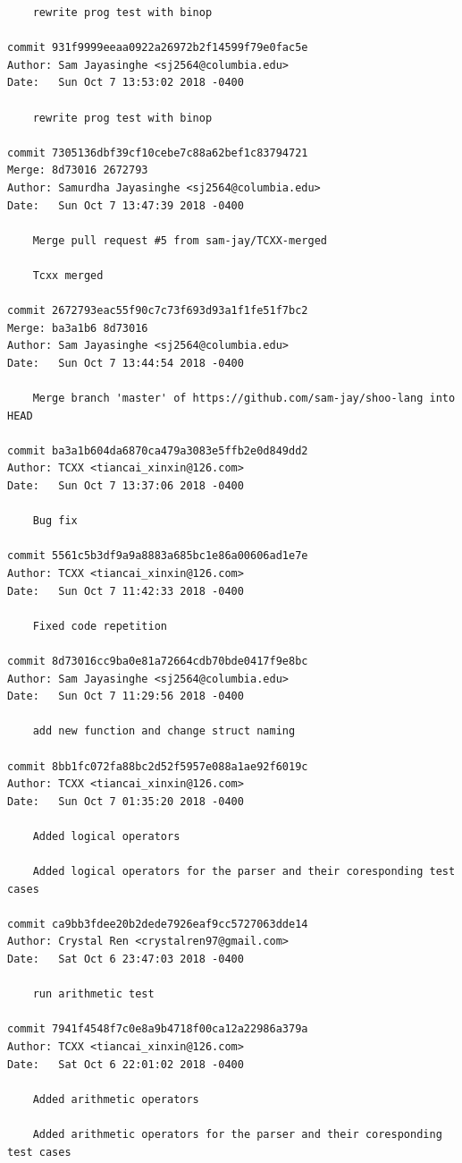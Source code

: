 \documentclass[12pt]{article}
\begin{document}
\begin{lstlisting}
    rewrite prog test with binop

commit 931f9999eeaa0922a26972b2f14599f79e0fac5e
Author: Sam Jayasinghe <sj2564@columbia.edu>
Date:   Sun Oct 7 13:53:02 2018 -0400

    rewrite prog test with binop

commit 7305136dbf39cf10cebe7c88a62bef1c83794721
Merge: 8d73016 2672793
Author: Samurdha Jayasinghe <sj2564@columbia.edu>
Date:   Sun Oct 7 13:47:39 2018 -0400

    Merge pull request #5 from sam-jay/TCXX-merged
    
    Tcxx merged

commit 2672793eac55f90c7c73f693d93a1f1fe51f7bc2
Merge: ba3a1b6 8d73016
Author: Sam Jayasinghe <sj2564@columbia.edu>
Date:   Sun Oct 7 13:44:54 2018 -0400

    Merge branch 'master' of https://github.com/sam-jay/shoo-lang into HEAD

commit ba3a1b604da6870ca479a3083e5ffb2e0d849dd2
Author: TCXX <tiancai_xinxin@126.com>
Date:   Sun Oct 7 13:37:06 2018 -0400

    Bug fix

commit 5561c5b3df9a9a8883a685bc1e86a00606ad1e7e
Author: TCXX <tiancai_xinxin@126.com>
Date:   Sun Oct 7 11:42:33 2018 -0400

    Fixed code repetition

commit 8d73016cc9ba0e81a72664cdb70bde0417f9e8bc
Author: Sam Jayasinghe <sj2564@columbia.edu>
Date:   Sun Oct 7 11:29:56 2018 -0400

    add new function and change struct naming

commit 8bb1fc072fa88bc2d52f5957e088a1ae92f6019c
Author: TCXX <tiancai_xinxin@126.com>
Date:   Sun Oct 7 01:35:20 2018 -0400

    Added logical operators
    
    Added logical operators for the parser and their coresponding test cases

commit ca9bb3fdee20b2dede7926eaf9cc5727063dde14
Author: Crystal Ren <crystalren97@gmail.com>
Date:   Sat Oct 6 23:47:03 2018 -0400

    run arithmetic test

commit 7941f4548f7c0e8a9b4718f00ca12a22986a379a
Author: TCXX <tiancai_xinxin@126.com>
Date:   Sat Oct 6 22:01:02 2018 -0400

    Added arithmetic operators
    
    Added arithmetic operators for the parser and their coresponding test cases


\end{lstlisting}
\end{document}
